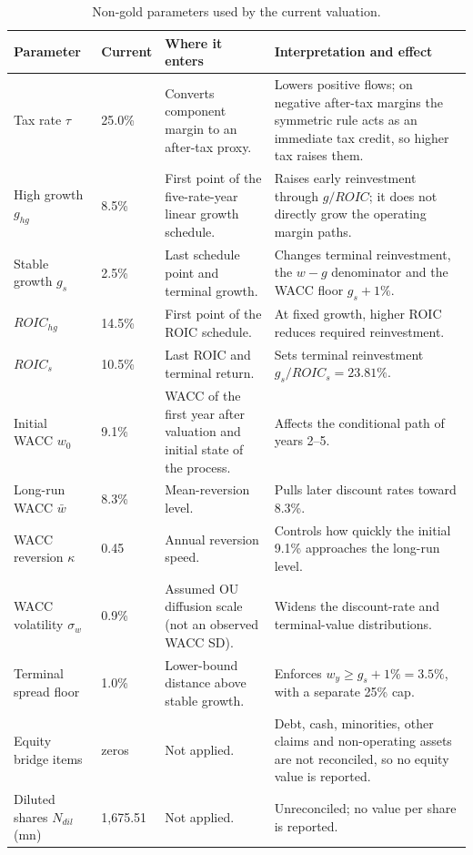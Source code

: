 \begin{table}[H]
\centering
\caption{Non-gold parameters used by the current valuation.}
\label{tab:current-editable-valuation-parameters}
\scriptsize
\setlength{\tabcolsep}{3pt}
\renewcommand{\arraystretch}{1.10}
\begin{tabularx}{\textwidth}{@{}p{3.15cm}p{1.35cm}X X@{}}
\toprule
Parameter & Current & Where it enters & Interpretation and effect \\
\midrule
Tax rate \(\tau\) & 25.0\% & Converts component margin to an
after-tax proxy. & Lowers positive flows; on negative after-tax margins the
symmetric rule acts as an immediate tax credit, so higher tax raises them. \\
High growth \(g_{hg}\) & 8.5\% & First point of the five-rate-year linear
growth schedule. & Raises early reinvestment through \(g/ROIC\); it does not
directly grow the operating margin paths. \\
Stable growth \(g_s\) & 2.5\% & Last schedule point and terminal
growth. & Changes terminal reinvestment, the \(w-g\) denominator and the WACC
floor \(g_s+1\%\). \\
\(ROIC_{hg}\) & 14.5\% & First point of the ROIC schedule. & At
fixed growth, higher ROIC reduces required reinvestment. \\
\(ROIC_s\) & 10.5\% & Last ROIC and terminal return. & Sets
terminal reinvestment \(g_s/ROIC_s=23.81\%\). \\
Initial WACC \(w_0\) & 9.1\% & WACC of the first year after valuation and
initial state of the process. & Affects the conditional path of years 2--5. \\
Long-run WACC \(\bar w\) & 8.3\% & Mean-reversion level. & Pulls later
discount rates toward 8.3\%. \\
WACC reversion \(\kappa\) & 0.45 & Annual reversion speed. & Controls how
quickly the initial 9.1\% approaches the long-run level. \\
WACC volatility \(\sigma_w\) & 0.9\% & Assumed OU diffusion scale (not an
observed WACC SD). &
Widens the discount-rate and terminal-value distributions. \\
Terminal spread floor & 1.0\% & Lower-bound distance above
stable growth. & Enforces \(w_y\geq g_s+1\%=3.5\%\), with a separate 25\% cap. \\
Equity bridge items & zeros & Not applied. & Debt, cash, minorities,
other claims and non-operating assets are not reconciled, so no equity value is
reported. \\
Diluted shares \(N_{dil}\) (mn) & 1,675.51 & Not applied. & Unreconciled; no value
per share is reported. \\
\bottomrule
\end{tabularx}
\end{table}


